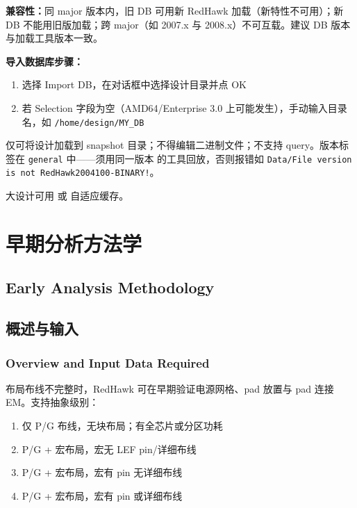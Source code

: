 \textbf{兼容性：}同 major 版本内，旧 DB 可用新 RedHawk 加载（新特性不可用）；新 DB 不能用旧版加载；跨 major（如 2007.x 与 2008.x）不可互载。建议 DB 版本与加载工具版本一致。

\textbf{导入数据库步骤：}
\begin{enumerate}
  \item 选择 Import DB，在对话框中选择设计目录并点 OK
  \item 若 Selection 字段为空（AMD64/Enterprise 3.0 上可能发生），手动输入目录名，如 \texttt{/home/design/MY\_DB}
\end{enumerate}

\begin{noteBox}
仅可将设计加载到 snapshot 目录；不得编辑二进制文件；不支持 query。版本标签在 \texttt{general} 中——须用同一版本  的工具回放，否则报错如 \texttt{Data/File version is not RedHawk2004100-BINARY!}。
\end{noteBox}

大设计可用  或  自适应缓存。

\section{早期分析方法学}
\subsection*{Early Analysis Methodology}

\subsection{概述与输入}
\subsubsection*{Overview and Input Data Required}

布局布线不完整时，RedHawk 可在早期验证电源网格、pad 放置与 pad 连接 EM。支持抽象级别：
\begin{enumerate}
  \item 仅 P/G 布线，无块布局；有全芯片或分区功耗
  \item P/G + 宏布局，宏无 LEF pin/详细布线
  \item P/G + 宏布局，宏有 pin 无详细布线
  \item P/G + 宏布局，宏有 pin 或详细布线
\end{enumerate}


